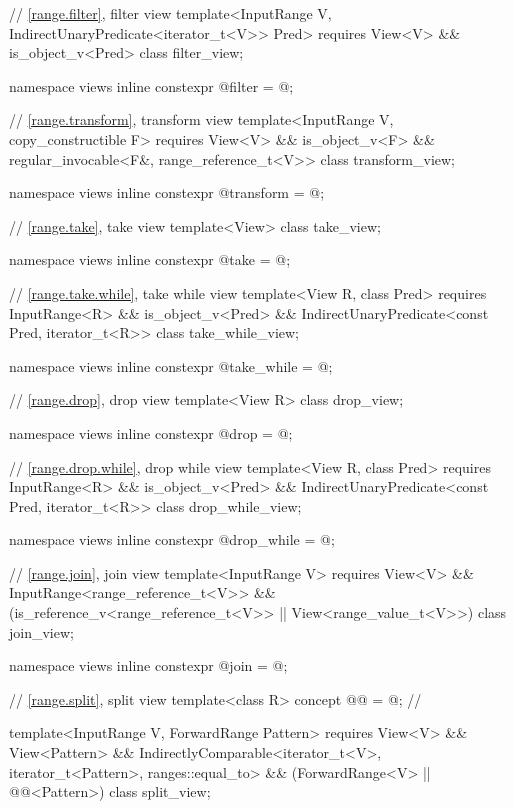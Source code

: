 \begin{codeblock}
{  // \ref{range.filter}, filter view
  template<InputRange V, IndirectUnaryPredicate<iterator_t<V>> Pred>
    requires View<V> && is_object_v<Pred>
  class filter_view;

  namespace views { inline constexpr @\unspec@ filter = @\unspec@; }

  // \ref{range.transform}, transform view
  template<InputRange V, copy_constructible F>
    requires View<V> && is_object_v<F> &&
             regular_invocable<F&, range_reference_t<V>>
  class transform_view;

  namespace views { inline constexpr @\unspec@ transform = @\unspec@; }

  // \ref{range.take}, take view
  template<View> class take_view;

  namespace views { inline constexpr @\unspec@ take = @\unspec@; }

  // \ref{range.take.while}, take while view
  template<View R, class Pred>
    requires InputRange<R> && is_object_v<Pred> &&
      IndirectUnaryPredicate<const Pred, iterator_t<R>>
    class take_while_view;

  namespace views { inline constexpr @\unspec@ take_while = @\unspec@; }

  // \ref{range.drop}, drop view
  template<View R>
    class drop_view;

  namespace views { inline constexpr @\unspec@ drop = @\unspec@; }

  // \ref{range.drop.while}, drop while view
  template<View R, class Pred>
    requires InputRange<R> && is_object_v<Pred> &&
      IndirectUnaryPredicate<const Pred, iterator_t<R>>
    class drop_while_view;

  namespace views { inline constexpr @\unspec@ drop_while = @\unspec@; }

  // \ref{range.join}, join view
  template<InputRange V>
    requires View<V> && InputRange<range_reference_t<V>> &&
             (is_reference_v<range_reference_t<V>> ||
              View<range_value_t<V>>)
  class join_view;

  namespace views { inline constexpr @\unspec@ join = @\unspec@; }

  // \ref{range.split}, split view
  template<class R>
    concept @@ = @\seebelow@;   // \expos

  template<InputRange V, ForwardRange Pattern>
    requires View<V> && View<Pattern> &&
             IndirectlyComparable<iterator_t<V>, iterator_t<Pattern>, ranges::equal_to> &&
             (ForwardRange<V> || @@<Pattern>)
  class split_view;

}
\end{codeblock}
